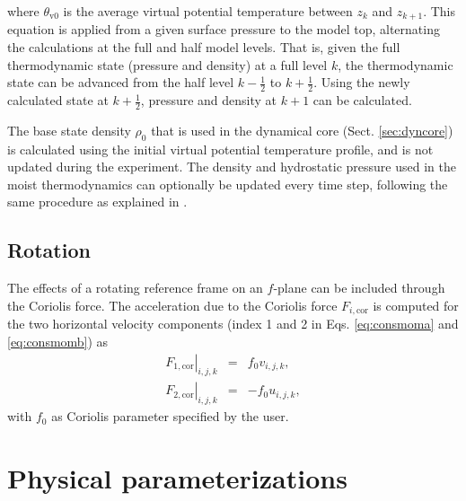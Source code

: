 \documentclass[gmd,manuscript]{copernicus}
\begin{document}
\noindent where $\theta_\mathrm{v0}$ is the average virtual potential temperature between $z_k$ and $z_{k+1}$. This equation is applied from a given surface pressure to the model top, alternating the calculations at the full and half model levels. That is, given the full thermodynamic state (pressure and density) at a full level $k$, the thermodynamic state can be advanced from the half level $k-\frac{1}{2}$ to $k+\frac{1}{2}$. Using the newly calculated state at $k+\frac{1}{2}$, pressure and density at $k+1$ can be calculated. 

The base state density $\rho_0$ that is used in the dynamical core (Sect. \ref{sec:dyncore}) is calculated using the initial virtual potential temperature profile, and is not updated during the experiment. The density and hydrostatic pressure used in the moist thermodynamics can optionally be updated every time step, following the same procedure as explained in \citet{Boing2014}.

\subsection{Rotation}
The effects of a rotating reference frame on an $f$-plane can be included through the Coriolis force. The acceleration due to the Coriolis force $F_{i,\textrm{cor}}$ is computed for the two horizontal velocity components (index 1 and 2 in Eqs. \ref{eq:consmoma} and \ref{eq:consmomb}) as
\begin{eqnarray}
\left. F_{1,\textrm{cor}} \right|_{i,j,k} & = & f_0 v_{i,j,k},\\
\left. F_{2,\textrm{cor}} \right|_{i,j,k} & = & -f_0 u_{i,j,k},
\end{eqnarray}
with $f_0$ as Coriolis parameter specified by the user.

\section{Physical parameterizations}\label{sec:parametrizations}
\end{document}
